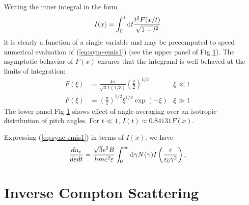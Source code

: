 \documentclass[12pt]{article}
\newcommand{\D}{{\rm d}}
\begin{document}
Writing the inner integral in the form
\begin{equation}
I(x) = \int_0^1 \D t \frac{t^2 F(x/t)}{\sqrt{1 - t^2}}
\end{equation}
it is clearly a function of a single variable and may be
precomputed to speed numerical evaluation of (\ref{eq:sync-emis1})
(see the upper panel of Fig \ref{anglefun-fig}).
The asymptotic behavior of $F(x)$ ensures that the integrand
is well behaved at the limits of integration:
\begin{align}
F(\xi) &=
\frac{4\pi}{\sqrt{3}\Gamma(1/3)}\left(\frac{\xi}{2}\right)^{1/3}
     & \xi \ll 1 \\
F(\xi) &=
\left(\frac{\pi}{2}\right)^{1/2}\xi^{1/2} \exp(-\xi)
     & \xi \gg 1
\end{align}
The lower panel Fig \ref{anglefun-fig} shows
effect of angle-averaging over an isotropic distribution of pitch
angles.  For $t \ll 1$, $I(t) \approx 0.84131 F(x)$.

Expressing (\ref{eq:sync-emis1}) in terms of $I(x)$, we have
\begin{equation}
\frac{dn_\varepsilon}{d\varepsilon dt} =
\frac{\sqrt{3} e^3 B}{hmc^2\varepsilon}
\int_0^\infty \D\gamma N(\gamma) I\left(\frac{\varepsilon}{\varepsilon_0\gamma^2}\right),
\label{eq:sync-emis}
\end{equation}

\begin{figure}
\hbox{\hspace*{-0.25in}}
\caption{}
\label{anglefun-fig}
\end{figure}

\clearpage
\newpage

\section{Inverse Compton Scattering}
\end{document}

